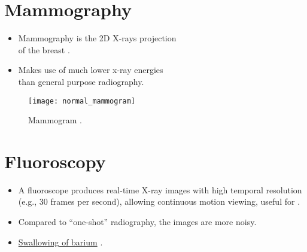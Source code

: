 \section{Mammography}
\begin{itemize}
\item Mammography is the 2D X-rays projection\\ of the breast
  \cite{bushberg2011essential}.
\item Makes use of much lower x-ray energies\\ than general purpose
  radiography.
\end{itemize}
\vspace{-24ex}
\begin{figure}[H]
  \begin{flushright}
    \texttt{[image: normal\_mammogram]}
    \end{flushright}
    \caption{Mammogram \cite{CDC_mammograms}.\label{fig:mamogram}}
\end{figure}

\section{Fluoroscopy}
\begin{itemize}
\item A fluoroscope produces real-time X-ray images with high temporal
  resolution (e.g., 30 frames per second), allowing continuous motion
  viewing, useful for 
  \cite{bushberg2011essential}.
\item Compared to ``one-shot'' radiography, the images are more noisy.
\item
  \href{https://en.wikipedia.org/wiki/Fluoroscopy#/media/File:Normal_barium_swallow_animation.gif}{Swallowing
    of barium} \cite{Wikipedia_Fluoroscopy}.
\end{itemize}

